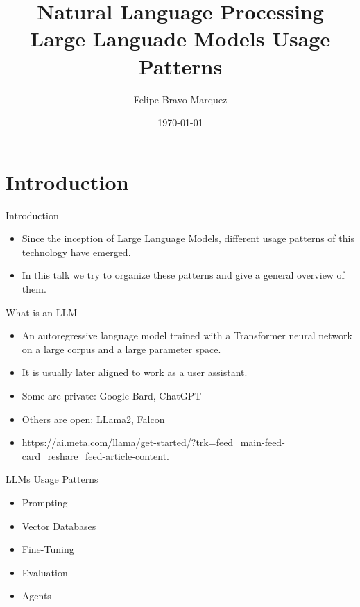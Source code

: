 \documentclass[handout]{beamer}
\title{Natural Language Processing \\ Large Languade Models Usage Patterns}
\author[Felipe Bravo Márquez]{\footnotesize
 \textcolor[rgb]{0.00,0.00,1.00}{Felipe Bravo-Marquez}}
\date{\today}
\begin{document}
\begin{frame}
\titlepage


\end{frame}



\section{Introduction}
\begin{frame}{Introduction}
\begin{scriptsize}
\begin{itemize}
\item Since the inception of Large Language Models, different usage patterns of this technology have emerged.
\item In this talk we try to organize these patterns and give a general overview of them.
\end{itemize}
\end{scriptsize}
\end{frame}



\begin{frame}{What is an LLM}
\begin{scriptsize}
\begin{itemize}
\item An autoregressive language model trained with a Transformer neural network on a large corpus and a large parameter space.
\item It is usually later aligned to work as a user assistant.
\item Some are private: Google Bard, ChatGPT
\item Others are open: LLama2, Falcon
\item \url{https://ai.meta.com/llama/get-started/?trk=feed_main-feed-card_reshare_feed-article-content}.
\end{itemize}
\end{scriptsize}
\end{frame}

\begin{frame}{LLMs Usage Patterns}
\begin{scriptsize}
\begin{itemize}
\item Prompting
\item Vector Databases
\item Fine-Tuning
\item Evaluation
\item Agents
\end{itemize}
\end{scriptsize}
\end{frame}
\end{document}
